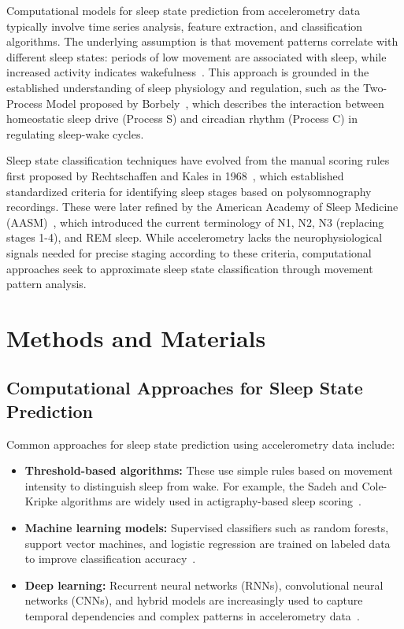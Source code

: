 \documentclass[conference]{IEEEtran}
\begin{document}
Computational models for sleep state prediction from accelerometry data typically involve time series analysis, feature extraction, and classification algorithms. The underlying assumption is that movement patterns correlate with different sleep states: periods of low movement are associated with sleep, while increased activity indicates wakefulness~\cite{pmc4883440, researchgate2021, sadeh2011}. This approach is grounded in the established understanding of sleep physiology and regulation, such as the Two-Process Model proposed by Borbely~\cite{borbely1982}, which describes the interaction between homeostatic sleep drive (Process S) and circadian rhythm (Process C) in regulating sleep-wake cycles.

Sleep state classification techniques have evolved from the manual scoring rules first proposed by Rechtschaffen and Kales in 1968~\cite{rechtschaffen1968}, which established standardized criteria for identifying sleep stages based on polysomnography recordings. These were later refined by the American Academy of Sleep Medicine (AASM)~\cite{aasm2007}, which introduced the current terminology of N1, N2, N3 (replacing stages 1-4), and REM sleep. While accelerometry lacks the neurophysiological signals needed for precise staging according to these criteria, computational approaches seek to approximate sleep state classification through movement pattern analysis.

\section{Methods and Materials}

\subsection{Computational Approaches for Sleep State Prediction}
Common approaches for sleep state prediction using accelerometry data include:
\begin{itemize}
	\item \textbf{Threshold-based algorithms:} These use simple rules based on movement intensity to distinguish sleep from wake. For example, the Sadeh and Cole-Kripke algorithms are widely used in actigraphy-based sleep scoring~\cite{van2011review, sadeh2011}.
	\item \textbf{Machine learning models:} Supervised classifiers such as random forests, support vector machines, and logistic regression are trained on labeled data to improve classification accuracy~\cite{van2011review, zhang2020machine, vanHees2015}.
	\item \textbf{Deep learning:} Recurrent neural networks (RNNs), convolutional neural networks (CNNs), and hybrid models are increasingly used to capture temporal dependencies and complex patterns in accelerometry data~\cite{zhang2020machine, behar2013}.
\end{itemize}
\end{document}
